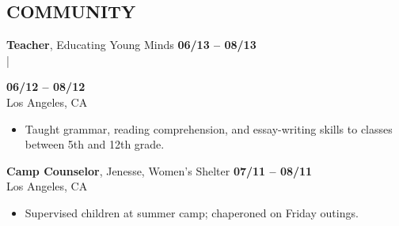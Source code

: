 \documentclass[line, letterpaper, 10pt]{res}
\begin{document}
\begin{resume}
\section{COMMUNITY}
    {\bf Teacher}, Educating Young Minds \hfill {\bf 06/13 -- 08/13} \\
    |\raggedright{\hfill {\bf 06/12 -- 08/12}} \\
    Los Angeles, CA
    \begin{itemize} \itemsep -2pt
        \item Taught grammar, reading comprehension, and essay-writing skills to classes between 5th and 12th grade.
    \end{itemize}

    {\bf Camp Counselor}, Jenesse, Women's Shelter \hfill {\bf 07/11 -- 08/11} \\
    Los Angeles, CA
    \begin{itemize} \itemsep -2pt %
        \item Supervised children at summer camp; chaperoned on Friday outings.
    \end{itemize}


\end{resume}
\end{document}
